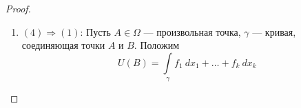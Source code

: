 \begin{proof}
\begin{enumerate}
\[\begin{cases}
            x_1=x_1^{i-1}+u_1 t,\\
            \tab[1.4cm]\vdots\\
            x_k=x_k^{i-1}+u_k t
        \end{cases}\]
        где $t\in [0,|\Delta_i|]$ и $\vec{u}=(u_1,\dots,u_k)$ и $\|u\|=1$.
        \begin{multline*}
            \int\limits_{\Lambda(T_n)}f_1\ dx_1+\dots+f_k\ dx_k-\sigma(f, T_n, H)=\\
            =\sum\limits_{i=1}^{n}\int\limits_{\Delta_i}f_1\ dx_1+\dots+f_k\ dx_k-\sum\limits_{i=1}^{n}\int\limits_{\Delta_i}f_1(\phi(\xi_i))\ dx_1+\dots+f_k(\phi(\xi_i))\ dx_k=\\
            =\sum\limits_{i=1}^{n}\int\limits_{\Delta_i}\Big(f_1(x)-f_1(\phi(\xi_i))\Big)\ dx_1+\dots+\Big(f_k(x)-f_k(\phi(\xi_i))\Big)\ dx_k=\\
            =\sum\limits_{i=1}^{n}\int\limits_{0}^{|\Delta_i|}\Big(\Big(f_1(\widetilde{\phi}(t))-f_1(\phi(\xi_i))\Big)u_1+\dots+\Big(f_k(\widetilde{\phi}(t))-f_k(\phi(\xi_i))\Big)u_k\Big)\ dt
        \end{multline*}
        Найдем такой компакт $E$ в $\Omega$, что $\gamma\subset E^o$. Поскольку все $f_j$ непрерывны на $\Omega$, то они равномерно непрерывны на $E$. Тогда
        \begin{multline*}
            \int\limits_{0}^{|\Delta_i|}\Big(\Big(f_1(\widetilde{\phi}(t))-f_1(\phi(\xi_i))\Big)u_1+\dots+\Big(f_k(\widetilde{\phi}(t))-f_k(\phi(\xi_i))\Big)u_k\Big)\ dt\leq\\
            \leq |\Delta_i|\cdot \max{|g|}\leq \epsilon\cdot |\Delta_i|\cdot \sum\limits_{i=1}^{k}|u_i|\overset{(1)}{\leq} \epsilon\cdot \sqrt{k}\cdot |\Delta_i| 
        \end{multline*}
        где 
        \[g=\Big(f_1(\widetilde{\phi}(t))-f_1(\phi(\xi_i))\Big)u_1+\dots+\Big(f_k(\widetilde{\phi}(t))-f_k(\phi(\xi_i))\Big)u_k\] 
        (1): Применили неравенство между средним арифметическим и средним квадратичным:
        \[\frac{1}{k}\cdot \sum\limits_{i=1}^{n}|u_i|\leq \sqrt{\frac{1}{k}\cdot \sum\limits_{i=1}^k u_i^2}=\frac{1}{\sqrt{k}}\]
        Итак
        \[\left|\ \int\limits_{\Lambda(T_n)}f_1\ dx_1+\dots+f_k\ dx_k-\sigma(T_n)\right|\leq \epsilon\cdot \sqrt{k}\cdot \sum\limits_i |\Delta_i|\leq \epsilon\cdot \sqrt{k}\cdot |\gamma|\]
        \item $(4)\Rightarrow(1)$: Пусть $A\in \Omega$ --- произвольная точка, $\gamma$ --- кривая, соединяющая точки $A$ и $B$. Положим 
        \[U(B)=\int\limits_{\gamma}f_1\ dx_1+\dots+f_k\ dx_k\]

\end{enumerate}
\end{proof}
